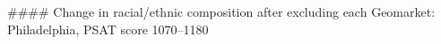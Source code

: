 #### Change in racial/ethnic composition after excluding each Geomarket: Philadelphia, PSAT score 1070–1180
